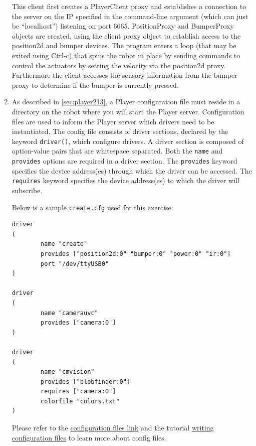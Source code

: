 \begin{enumerate}
 This client first creates a PlayerClient proxy and establishes a connection to the server on the IP specified in the command-line argument (which can just be ``localhost'') listening on port 6665. PositionProxy and BumperProxy objects are created, using the client proxy object to establish access to the position2d and bumper devices. The program enters a loop (that may be exited using Ctrl-c) that spins the robot in place by sending commands to control the actuators by setting the velocity via the position2d proxy. Furthermore the client accesses the sensory information from the bumper proxy to determine if the bumper is currently pressed.

\item \label{sec:3_config_file}As described in \ref{sec:player213}, a Player configuration file must reside in a directory on the robot where you will start the Player server. Configuration files are used to inform the Player server which drivers need to be instantiated. The config file consists of driver sections, declared by the keyword \texttt{driver()}, which configure drivers. A driver section is composed of option-value pairs that are whitespace separated. Both the \texttt{name} and \texttt{provides} options are required in a driver section. The \texttt{provides} keyword specifics the device address(es) through which the driver can be accessed. The \texttt{requires} keyword specifies the device address(es) to which the driver will subscribe.

Below is a sample \texttt{create.cfg} used for this exercise:

\begin{verbatim}
driver
(
        name "create"
        provides ["position2d:0" "bumper:0" "power:0" "ir:0"]
        port "/dev/ttyUSB0"
)

driver
(
        name "camerauvc"
        provides ["camera:0"]
)

driver
(
        name "cmvision"
        provides ["blobfinder:0"]
        requires ["camera:0"]
        colorfile "colors.txt"
)
\end{verbatim}

\noindent Please refer to the \href{http://playerstage.sourceforge.net/doc/Player-1.6.5/player-html/configfile.php}{configuration files link} and the tutorial \href{http://playerstage.sourceforge.net/doc/Player-2.1.0/player/group\_\_tutorial\_\_config.html}{writing configuration files} to learn more about config files.


\end{enumerate}

